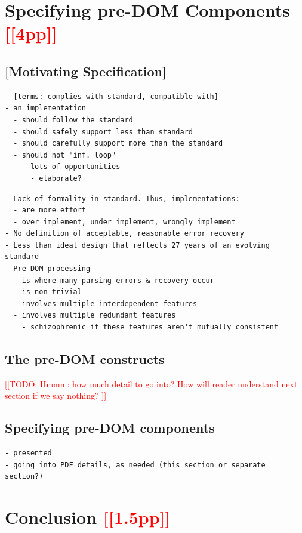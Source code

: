 \documentclass[conference,12pt]{IEEEtran}
\newcommand{\note}[1]{\noteYes{#1}}
\newcommand{\noteYes}[1]{\textcolor{red}{[[#1]]}}
\newcommand{\todo}[1]{\note{TODO: #1}}
\begin{document}
\section{Specifying pre-DOM Components \note{4pp}}
\label{sec:specifying}

\subsection{[Motivating Specification]}
\begin{lstlisting}[style=meta]
- [terms: complies with standard, compatible with]
- an implementation
  - should follow the standard
  - should safely support less than standard
  - should carefully support more than the standard
  - should not "inf. loop"
    - lots of opportunities
      - elaborate?
\end{lstlisting}


\begin{lstlisting}[style=meta]
- Lack of formality in standard. Thus, implementations:
  - are more effort
  - over implement, under implement, wrongly implement
- No definition of acceptable, reasonable error recovery
- Less than ideal design that reflects 27 years of an evolving standard
- Pre-DOM processing
  - is where many parsing errors & recovery occur
  - is non-trivial
  - involves multiple interdependent features
  - involves multiple redundant features
    - schizophrenic if these features aren't mutually consistent
\end{lstlisting}

\subsection{The pre-DOM constructs}
\todo{Hmmm: how much detail to go into?
      How will reader understand next section if we say nothing?
}

\subsection{Specifying pre-DOM components}
\begin{lstlisting}[style=meta]
- presented
- going into PDF details, as needed (this section or separate section?)
\end{lstlisting}

\section{Conclusion \note{1.5pp}}
\label{sec:conclusion}
\end{document}

